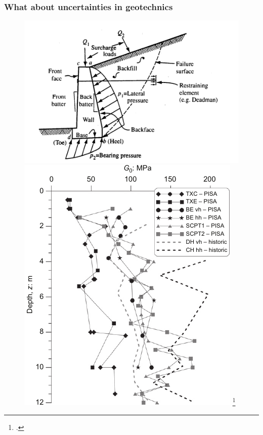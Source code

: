 \begin{frame}
\frametitle{What about uncertainties in geotechnics}

    \begin{figure}
    \includegraphics[scale=0.3]{figures/figure-retainingwall.png}    
    \hfill
    \includegraphics[scale=0.5]{figures/figure-UQtype2.pdf}
    \tiny\footcite{zdravkovic2020}
    \hfill

\end{figure}
\end{frame}
